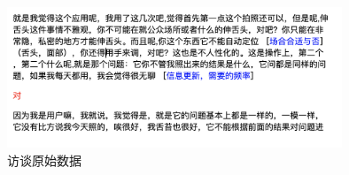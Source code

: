 \begin{figure}[htb]
    \centering
    \includegraphics[width=10cm]{images/data.png}
    \caption{访谈原始数据}
    \label{fig:datas}
\end{figure}





